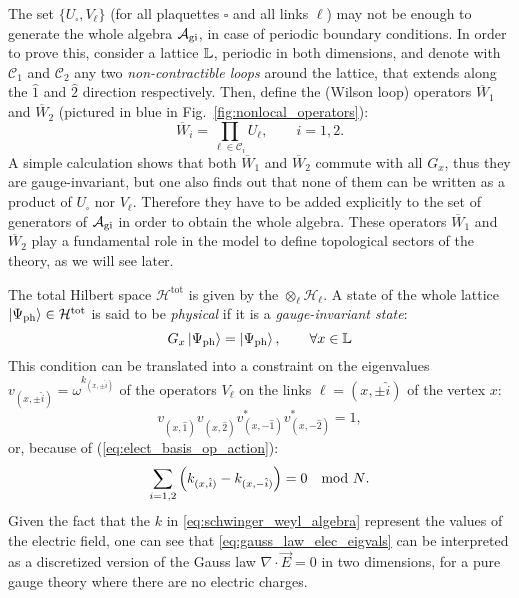 The set $\{U_{\square}, V_\ell\}$ (for all plaquettes $\square$ and all links $\ell$) may not be enough to generate the whole algebra $\mathcal{A}_{\text{gi}}$, in case of periodic boundary conditions.
In order to prove this, consider a lattice $\mathbb{L}$, periodic in both dimensions, and denote with $\mathcal{C}_1$ and $\mathcal{C}_2$  any two \emph{non-contractible loops} around the lattice, that extends along the $\hat{1}$ and $\hat{2}$ direction respectively.
Then, define the (Wilson loop) operators $\overline{W}_1$ and $\overline{W}_2$ (pictured in blue in Fig.~\ref{fig:nonlocal_operators}):
\begin{equation}
    \overline{W}_i = \prod_{\ell \in \mathcal{C}_i} U_\ell, \qquad i=1,2.
    \label{eq:top_wilson_loop}
\end{equation}
A simple calculation shows that both $\overline{W}_1$ and $\overline{W}_2$ commute with all $G_x$, thus they are gauge-invariant, but one also finds out that none of them can be written as a product of $U_{\square}$ nor $V_\ell$.
Therefore they have to be added explicitly to the set of generators of $\mathcal{A}_{\text{gi}}$ in order to obtain the whole algebra.
These operators $\overline{W}_1$ and $\overline{W}_2$ play a fundamental role in the model to define topological sectors of the theory, as we will see later.

The total Hilbert space $\mathcal{H}^{\text{tot}}$ is given by the $\otimes_{\ell} \mathcal{H}_{\ell}$.
A state of the whole lattice $\ket{\Psi_{\text{ph}}} \in \mathcal{H}^{\text{tot}}$ is said to be \emph{physical} if it is a \emph{gauge-invariant state}:
\begin{equation}
    G_x \ket{\Psi_{\text{ph}}} = \ket{\Psi_{\text{ph}}}, \qquad \forall x \in \mathbb{L}
    \label{eq:gauss_law}
\end{equation}
This condition can be translated into a constraint on the eigenvalues $v_{(x, \pm \hat{i})}= \omega^{k_{(x, \pm \hat{i})} }$  of the operators $V_\ell$ on the links $\ell = (x, \pm \hat{i})$ of the vertex $x$:
\begin{equation}
    v_{(x, \hat{1})}^{\phantom{\ast}}
    v_{(x, \hat{2})}^{\phantom{\ast}}
    v_{(x, -\hat{1})}^\ast
    v_{(x, -\hat{2})}^\ast = 1,
\end{equation}
or, because of (\ref{eq:elect_basis_op_action}):
\begin{equation}
    \sum_{i=1,2} \pqty{ k_{(x, \hat{i})} - k_{(x, -\hat{i})} } = 0 \quad \text{mod $N$}.
    \label{eq:gauss_law_elec_eigvals}
\end{equation}
Given the fact that the $k$ in \eqref{eq:schwinger_weyl_algebra} represent the values of the electric field, one can see that \eqref{eq:gauss_law_elec_eigvals} can be interpreted as a discretized version of the Gauss law $\nabla \cdot \vec{E} = 0$ in two dimensions,
for a pure gauge theory where there are no electric charges.


